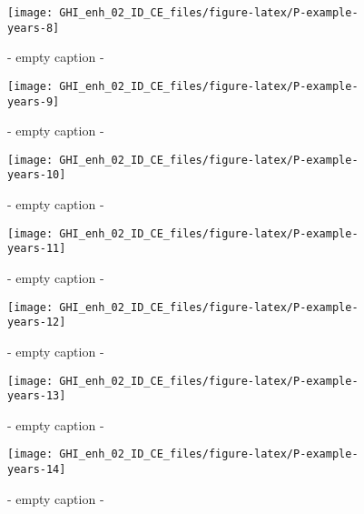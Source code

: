 \documentclass[
  10pt,
  a4paper,oneside]{article}
\begin{document}
\begin{figure}[H]

{\centering \texttt{[image: GHI\_enh\_02\_ID\_CE\_files/figure-latex/P-example-years-8]} 

}

\caption{ - empty caption - }\label{fig:P-example-years-8}
\end{figure}
\begin{figure}[H]

{\centering \texttt{[image: GHI\_enh\_02\_ID\_CE\_files/figure-latex/P-example-years-9]} 

}

\caption{ - empty caption - }\label{fig:P-example-years-9}
\end{figure}
\begin{figure}[H]

{\centering \texttt{[image: GHI\_enh\_02\_ID\_CE\_files/figure-latex/P-example-years-10]} 

}

\caption{ - empty caption - }\label{fig:P-example-years-10}
\end{figure}
\begin{figure}[H]

{\centering \texttt{[image: GHI\_enh\_02\_ID\_CE\_files/figure-latex/P-example-years-11]} 

}

\caption{ - empty caption - }\label{fig:P-example-years-11}
\end{figure}
\begin{figure}[H]

{\centering \texttt{[image: GHI\_enh\_02\_ID\_CE\_files/figure-latex/P-example-years-12]} 

}

\caption{ - empty caption - }\label{fig:P-example-years-12}
\end{figure}
\begin{figure}[H]

{\centering \texttt{[image: GHI\_enh\_02\_ID\_CE\_files/figure-latex/P-example-years-13]} 

}

\caption{ - empty caption - }\label{fig:P-example-years-13}
\end{figure}
\begin{figure}[H]

{\centering \texttt{[image: GHI\_enh\_02\_ID\_CE\_files/figure-latex/P-example-years-14]} 

}

\caption{ - empty caption - }\label{fig:P-example-years-14}
\end{figure}
\end{document}
